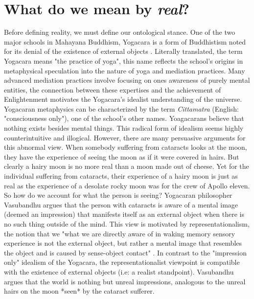 \section{What do we mean by \textit{real}?}
Before defining reality, we must define our ontological stance.
One of the two major schools in Mahayana Buddhism, Yogacara is a form of Buddhistism noted for its denial of the existence of external objects \cite{siderits2007buddhism} . Literally translated, the term Yogacara means "the practice of yoga", this name reflects the school's origins in metaphysical speculation into the nature of yoga and mediation practices. Many advanced mediation practices involve focusing on ones awareness of purely mental entities, the connection between these expertises and the achievement of Enlightenment motivates the Yogacara's idealist understanding of the universe. Yogacaran metaphysics can be characterized by the term \textit{Cittamatra} (English: "consciousness only"), one of the school's other names. Yoagacarans believe that nothing exists besides mental things. This radical form of idealism seems highly counterintuitive and illogical. However, there are many persuasive arguments for this abnormal view. When somebody suffering from cataracts looks at the moon, they have the experience of seeing the moon as if it were covered in hairs. But clearly a hairy moon is no more real than a moon made out of cheese. Yet for the individual suffering from cataracts, their experience of a hairy moon is just as real as the experience of a desolate rocky moon was for the crew of Apollo eleven. So how do we account for what the person is seeing? Yogacaran philosopher Vasubandhu argues that the person with cataracts is aware of a mental image (deemed an impression) that manifests itself as an external object when there is no such thing outside of the mind. This view is motivated by representationalism, the notion that we "what we are directly aware of in waking memory sensory experience is not the external object, but rather a mental image that resembles the object and is caused by sense-object contact" \cite{siderits2007buddhism}.  \newline In contrast to the "impression only" idealism of the Yogacara, the representationalist viewpoint is compatible with the existence of external objects (i.e: a realist standpoint). Vasubandhu argues that the world is nothing but unreal impressions, analogous to the unreal hairs on the moon *seen* by the cataract sufferer.
\newline
